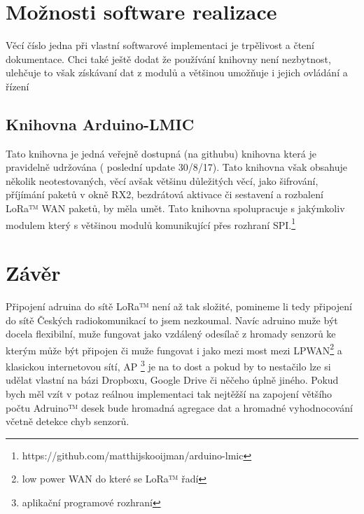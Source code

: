 \documentclass[paper=a4, fontsize=11pt]{scrartcl}
\numberwithin{equation}{section}
\numberwithin{figure}{section}
\numberwithin{table}{section}
\newcommand{\lr}{LoRa™ }
\newcommand{\ara}{adruina }
\newcommand{\Aro}{Adruino™ }
\newcommand{\aro}{adruino }
\begin{document}
\section{Možnosti software realizace}
	Věcí číslo jedna při vlastní softwarové implementaci je trpělivost a čtení dokumentace. Chci také ještě dodat že používání
	knihovny není nezbytnost, ulehčuje to však získávaní dat z modulů a většinou umožňuje i jejich ovládání a řízení 
		\subsection{Knihovna Arduino-LMIC}
		Tato knihovna je jedná veřejně dostupná (na githubu) knihovna která je 	pravidelně udržována ( poslední update 30/8/17). Tato
		knihovna však obsahuje několik neotestovaných, věcí avšak většinu důležitých věcí, 		jako šifrování, příjímání paketů v okně
		RX2, bezdrátová aktivace či	sestavení a rozbalení \lr WAN paketů, by měla umět. Tato knihovna spolupracuje s jakýmkoliv modulem
		který s většinou modulů komunikující přes rozhraní SPI.\footnote{https://github.com/matthijskooijman/arduino-lmic}
\section{Závěr}
	Připojení \ara do sítě \lr není až tak složité, pomineme li tedy připojení do sítě Českých radiokomunikací to jsem nezkoumal.
	Navíc \aro muže být docela flexibilní, muže fungovat jako vzdálený odesílač z hromady senzorů ke kterým může být připojen či muže
	fungovat i jako mezi most mezi LPWAN\footnote{low power WAN do které se \lr řadí} a klasickou internetovou sítí, AP
	\footnote{aplikační programové rozhraní} je na to dost a pokud by to nestačilo lze si udělat vlastní na bázi Dropboxu, Google Drive
	či něčeho úplně jiného. Pokud bych měl vzít v potaz reálnou implementaci tak nejtěžší na zapojení většího počtu \Aro desek bude
	hromadná agregace dat a hromadné vyhodnocování včetně detekce chyb senzorů.
\end{document}
